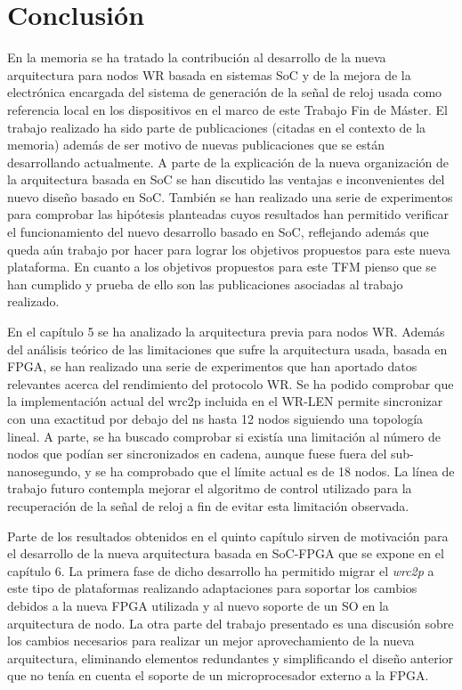 \chapter{Conclusión}

En la memoria se ha tratado la contribución al desarrollo de la nueva 
arquitectura para nodos WR basada en sistemas SoC y de la mejora de la 
electrónica encargada del sistema de generación de la señal de reloj usada como 
referencia local en los dispositivos en el marco de este Trabajo Fin de Máster. 
El trabajo realizado ha sido parte de publicaciones (citadas en el contexto de 
la memoria) además de ser motivo de nuevas publicaciones que se están 
desarrollando actualmente. A parte de la explicación de la nueva organización 
de la arquitectura basada en SoC se han discutido las ventajas e inconvenientes 
del nuevo diseño basado en SoC. También se han realizado una serie de 
experimentos para comprobar las hipótesis planteadas cuyos resultados han 
permitido verificar el funcionamiento del nuevo desarrollo basado en SoC, 
reflejando además que queda aún trabajo por hacer para lograr los objetivos 
propuestos para este nueva plataforma. En cuanto a los objetivos propuestos 
para este TFM pienso que se han cumplido y prueba de ello son las publicaciones 
asociadas al trabajo realizado.

En el capítulo 5 se ha analizado la arquitectura previa para nodos WR. Además 
del análisis teórico de las limitaciones que sufre la arquitectura usada, 
basada en FPGA, se han realizado una serie de experimentos que han aportado 
datos relevantes acerca del rendimiento del protocolo WR. Se ha podido 
comprobar que la implementación actual del \gls{wrc2p} incluida en el WR-LEN 
permite sincronizar con una exactitud por debajo del ns hasta 12 nodos 
siguiendo una topología lineal. A parte, se ha buscado comprobar si existía una 
limitación al número de nodos que podían ser sincronizados en cadena, aunque 
fuese fuera del sub-nanosegundo, y se ha comprobado que el límite actual es de 
18 nodos. La línea de trabajo futuro contempla mejorar el algoritmo de control 
utilizado para la recuperación de la señal de reloj a fin de evitar esta 
limitación observada.

Parte de los resultados obtenidos en el quinto capítulo sirven de motivación 
para el desarrollo de la nueva arquitectura basada en SoC-FPGA que se expone en 
el capítulo 6. La primera fase de dicho desarrollo ha permitido migrar el 
\textit{wrc2p} a este tipo de plataformas realizando adaptaciones para soportar 
los cambios debidos a la nueva FPGA utilizada y al nuevo soporte de un SO en la 
arquitectura de nodo. La otra parte del trabajo presentado es una discusión 
sobre los cambios necesarios para realizar un mejor aprovechamiento de la nueva 
arquitectura, eliminando elementos redundantes y simplificando el diseño 
anterior que no tenía en cuenta el soporte de un microprocesador externo a la 
FPGA.

